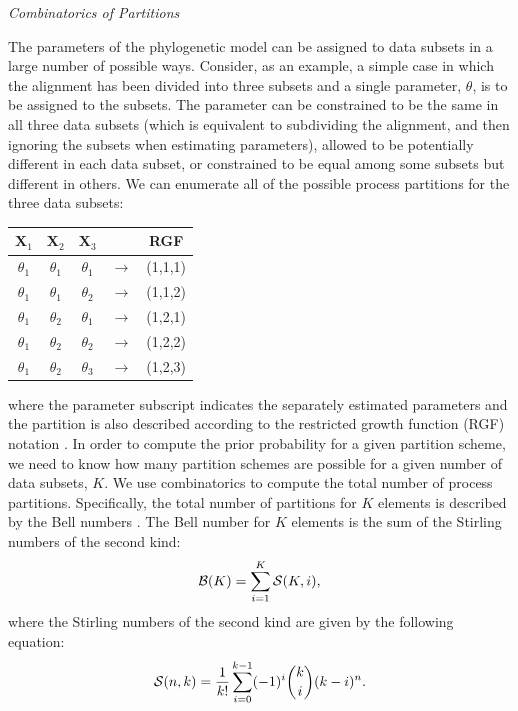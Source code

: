 \documentclass[11pt]{article}
\begin{document}
\bigskip

\begin{center}
{\it Combinatorics of Partitions}
\end{center}

The parameters of the phylogenetic model can be assigned to data subsets in a large number of possible ways.
Consider, as an example, a simple case in which the alignment has been divided into three subsets and a single parameter, $\theta$, is to be assigned to the subsets.
The parameter can be constrained to be the same in all three data subsets (which is equivalent to subdividing the alignment, and then ignoring the subsets when estimating parameters), allowed to be potentially different in each data subset, or constrained to be equal among some subsets but different in others.
We can enumerate all of the possible process partitions for the three data subsets:
\begin{center}
\begin{tabular}{ccccc}
${\mathbf X}_1$ & ${\mathbf X}_2$ & ${\mathbf X}_3$ & & RGF \\ \hline
$\theta_1$ & $\theta_1$ & $\theta_1$ & $\rightarrow$ & (1,1,1) \\
$\theta_1$ & $\theta_1$ & $\theta_2$ & $\rightarrow$ & (1,1,2) \\
$\theta_1$ & $\theta_2$ & $\theta_1$ & $\rightarrow$ & (1,2,1) \\
$\theta_1$ & $\theta_2$ & $\theta_2$ & $\rightarrow$ & (1,2,2) \\
$\theta_1$ & $\theta_2$ & $\theta_3$ & $\rightarrow$ & (1,2,3) \\
\end{tabular}
\end{center}
where the parameter subscript indicates the separately estimated parameters and the partition is also described according to the restricted growth function (RGF) notation \citep{stanton86}. 
In order to compute the prior probability for a given partition scheme, we need to know how many partition schemes are possible for a given number of data subsets, $K$.
We use combinatorics to compute the total number of process partitions. 
Specifically, the total number of partitions for $K$ elements is described by the Bell numbers \citep{bell34}.
The Bell number for $K$ elements is the sum of the Stirling numbers of the second kind:
\begin{align} \label{eq:bell_num}
{\cal B}(K) = \sum_{i=1}^K {\cal S}(K,i),
\end{align}
where the Stirling numbers of the second kind are given by the following equation:
\begin{align}
{\cal S}(n, k) = {1 \over k!} \sum_{i=0}^{k-1} (-1)^i {k \choose i} (k-i)^{n}.
\end{align}
\end{document}
